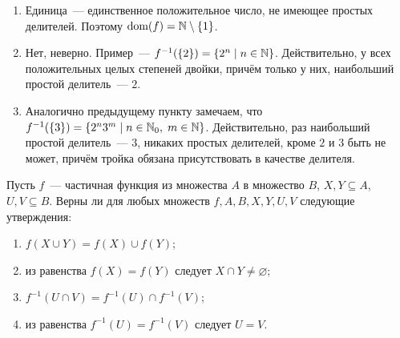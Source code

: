 \begin{Answer}
    \noindent
    \begin{enumerate}[label=\textbf{\alph*)}]
        \item
            Единица~--- единственное положительное число, не имеющее простых делителей.
            Поэтому $ \operatorname*{\textnormal{dom}}(f) = \mathbb{N} \setminus \{ 1 \} $.
        \item
            Нет, неверно.
            Пример~--- $ f^{-1}(\{ 2 \}) = \{ 2^n \mid n \in \mathbb{N} \} $.
            Действительно, у всех положительных целых степеней двойки, причём только у них, наибольший простой делитель~--- $ 2 $.
        \item
            Аналогично предыдущему пункту замечаем, что $ f^{-1}(\{ 3 \}) = \{ 2^n 3^m \mid n \in \mathbb{N}_0, \; m \in \mathbb{N} \} $.
            Действительно, раз наибольший простой делитель~--- $ 3 $,
            никаких простых делителей, кроме $ 2 $ и $ 3 $ быть не может,
            причём тройка обязана присутствовать в качестве делителя.
    \end{enumerate}
\end{Answer}


\begin{Exercise}[counter=SecExercise, label={exercise:functions:set_operations}]
    \noindent
    Пусть $ f $~--- частичная функция из множества $ A $ в множество $ B $,
    $ X, Y \subseteq A $, $ U, V \subseteq B $.
    Верны ли для любых множеств $ f, A, B, X, Y, U, V $ следующие утверждения:
    \begin{enumerate}[label=\textbf{\alph*)}]
        \item $ f (X \cup Y) = f (X) \cup f (Y) $;
        \item из равенства $ f(X) = f(Y) $ следует $ X \cap Y \neq \varnothing $;
        \item $ f^{-1}(U \cap V) = f^{-1}(U) \cap f^{-1}(V) $;
        \item из равенства $ f^{-1}(U) = f^{-1}(V) $ следует $ U = V $.
    \end{enumerate}
\end{Exercise}

